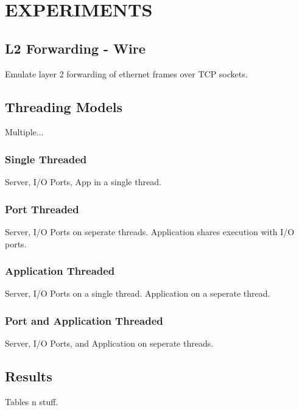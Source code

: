 \chapter{EXPERIMENTS}
\label{expr}

\section{L2 Forwarding - Wire}
\label{expr:wire}
Emulate layer 2 forwarding of ethernet frames over TCP sockets.

\section{Threading Models}
\label{expr:models}
Multiple...

\subsection{Single Threaded}
\label{expr:models-single}
Server, I/O Ports, App in a single thread.

\subsection{Port Threaded}
\label{expr:models-port}
Server, I/O Ports on seperate threads. Application shares execution
with I/O ports.

\subsection{Application Threaded}
\label{expr:models-app}
Server, I/O Ports on a single thread. Application on a seperate thread.

\subsection{Port and Application Threaded}
\label{expr:models-port-app}
Server, I/O Ports, and Application on seperate threads.

\section{Results}
\label{expr:results}
Tables n stuff.
